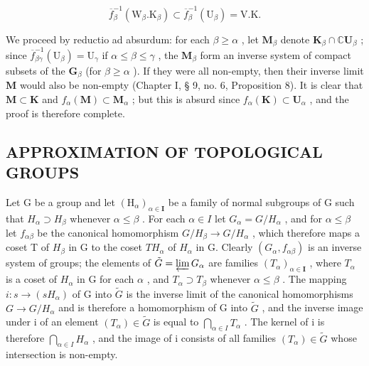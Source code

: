 \[
\overline {{f}} _ {\beta} ^ {-1} (\mathrm{W} _ {\beta}. \mathrm{K} _ {\beta}) \subset \overline {{f}} _ {\beta} ^ {-1} (\mathrm{U} _ {\beta}) = \mathrm{V}. \mathrm{K}.
\]

We proceed by reductio ad absurdum: for each \(\beta \geqslant \alpha\) , let \(\mathbf{M}_{\beta}\) denote \(\mathbf{K}_{\beta} \cap \mathbb{C}\mathbf{U}_{\beta}\) ; since \(\overline{f}_{\beta \gamma}^{-1}(\mathrm{U}_{\beta}) = \mathrm{U}_{\gamma}\) if \(\alpha \leqslant \beta \leqslant \gamma\) , the \(\mathbf{M}_{\beta}\) form an inverse system of compact subsets of the \(\mathbf{G}_{\beta}\) (for \(\beta \geqslant \alpha\) ). If they were all non-empty, then their inverse limit \(\mathbf{M}\) would also be non-empty (Chapter I, § 9, no. 6, Proposition 8). It is clear that \(\mathbf{M} \subset \mathbf{K}\) and \(f_{\alpha}(\mathbf{M}) \subset \mathbf{M}_{\alpha}\) ; but this is absurd since \(f_{\alpha}(\mathbf{K}) \subset \mathbf{U}_{\alpha}\) , and the proof is therefore complete.

\subsection{APPROXIMATION OF TOPOLOGICAL GROUPS}

Let G be a group and let \((\mathrm{H}_{\alpha})_{\alpha\in\mathbf{I}}\) be a family of normal subgroups of G such that \(H_{\alpha}\supset H_{\beta}\) whenever \(\alpha\leqslant\beta\) . For each \(\alpha\in I\) let \(G_{\alpha}=G/H_{\alpha}\) , and for \(\alpha\leqslant\beta\) let \(f_{\alpha\beta}\) be the canonical homomorphism \(G/H_{\beta}\to G/H_{\alpha}\) , which therefore maps a coset T of \(H_{\beta}\) in G to the coset \(TH_{\alpha}\) of \(H_{\alpha}\) in G. Clearly \((G_{\alpha},f_{\alpha\beta})\) is an inverse system of groups; the elements of \(\tilde{G}=\varprojlim G_{\alpha}\) are families \((T_{\alpha})_{\alpha\in\mathbf{I}}\) , where \(T_{\alpha}\) is a coset of \(H_{\alpha}\) in G for each \(\alpha\) , and \(T_{\alpha}\supset T_{\beta}\) whenever \(\alpha\leqslant\beta\) . The mapping \(i:s\to(sH_{\alpha})\) of G into \(\tilde{G}\) is the inverse limit of the canonical homomorphisms \(G\to G/H_{\alpha}\) and is therefore a homomorphism of G into \(\tilde{G}\) , and the inverse image under i of an element \((T_{\alpha})\in\tilde{G}\) is equal to \(\bigcap_{\alpha\in I}T_{\alpha}\) . The kernel of i is therefore \(\bigcap_{\alpha\in I}H_{\alpha}\) , and the image of i consists of all families \((T_{\alpha})\in\tilde{G}\) whose intersection is non-empty.


